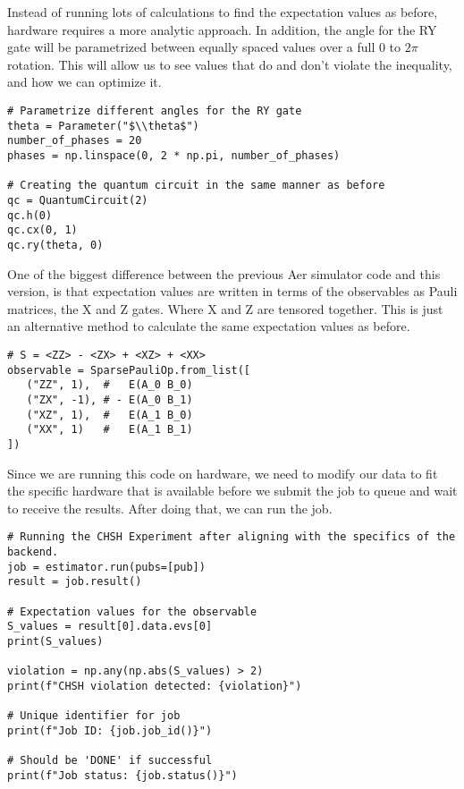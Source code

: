 \documentclass[12pt]{article}
\begin{document}
Instead of running lots of calculations to find the expectation values as before, hardware requires a more analytic approach. In addition, the angle for the RY gate will be parametrized between equally spaced values over a full 0 to $2\pi$ rotation. This will allow us to see values that do and don't violate the inequality, and how we can optimize it.

\begin{lstlisting}[style=python]
# Parametrize different angles for the RY gate
theta = Parameter("$\\theta$")
number_of_phases = 20
phases = np.linspace(0, 2 * np.pi, number_of_phases)

# Creating the quantum circuit in the same manner as before
qc = QuantumCircuit(2)
qc.h(0)
qc.cx(0, 1)
qc.ry(theta, 0)
\end{lstlisting}

One of the biggest difference between the previous Aer simulator code and this version, is that expectation values are written in terms of the observables as Pauli matrices, the X and Z gates. Where X and Z are tensored together. This is just an alternative method to calculate the same expectation values as before.

\begin{lstlisting}[style=python]
# S = <ZZ> - <ZX> + <XZ> + <XX>
observable = SparsePauliOp.from_list([
   ("ZZ", 1),  #   E(A_0 B_0)
   ("ZX", -1), # - E(A_0 B_1)
   ("XZ", 1),  #   E(A_1 B_0)
   ("XX", 1)   #   E(A_1 B_1)
])    
\end{lstlisting}

Since we are running this code on hardware, we need to modify our data to fit the specific hardware that is available before we submit the job to queue and wait to receive the results. After doing that, we can run the job.

\begin{lstlisting}[style=python]
# Running the CHSH Experiment after aligning with the specifics of the backend.
job = estimator.run(pubs=[pub])
result = job.result()

# Expectation values for the observable
S_values = result[0].data.evs[0] 
print(S_values)

violation = np.any(np.abs(S_values) > 2)
print(f"CHSH violation detected: {violation}")

# Unique identifier for job
print(f"Job ID: {job.job_id()}") 

# Should be 'DONE' if successful
print(f"Job status: {job.status()}") 
\end{lstlisting}
\end{document}
